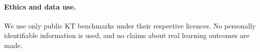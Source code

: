 \documentclass[runningheads]{llncs}
\begin{document}
\paragraph{Ethics and data use.}
We use only public KT benchmarks under their respective licences. No
personally identifiable information is used, and no claims about real
learning outcomes are made.


\end{document}
